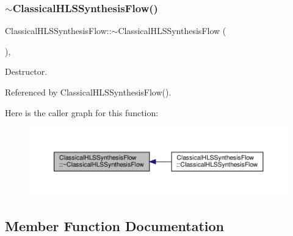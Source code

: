 \subsubsection{\texorpdfstring{$\sim$\+Classical\+H\+L\+S\+Synthesis\+Flow()}{~ClassicalHLSSynthesisFlow()}}
{\footnotesize\ttfamily Classical\+H\+L\+S\+Synthesis\+Flow\+::$\sim$\+Classical\+H\+L\+S\+Synthesis\+Flow (\begin{DoxyParamCaption}{ }\end{DoxyParamCaption})\hspace{0.3cm}{\ttfamily [override]}, {\ttfamily [default]}}



Destructor. 



Referenced by Classical\+H\+L\+S\+Synthesis\+Flow().

Here is the caller graph for this function\+:
\nopagebreak
\begin{figure}[H]
\begin{center}
\leavevmode
\includegraphics[width=350pt]{df/d60/classClassicalHLSSynthesisFlow_ae71c64737d2c5c597e3fc5d09d5ed766_icgraph}
\end{center}
\end{figure}


\subsection{Member Function Documentation}
\mbox{\label{classClassicalHLSSynthesisFlow_a2d0f357853fac7967af1aab06eb0198c}} 
